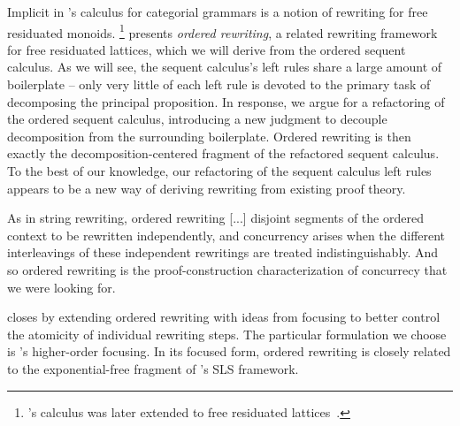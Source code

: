 Implicit in \citeauthor{Lambek:AMM58}'s calculus for categorial grammars is a notion of rewriting for free residuated monoids.%
\footnote{'s calculus was later extended to free residuated lattices~\parencites{Lambek:SLIM61}{Kanazawa:LLI92}.}
 presents \emph{ordered rewriting}, a related rewriting framework for free residuated lattices, which we will derive from the ordered sequent calculus.
As we will see, the sequent calculus's left rules share a large amount of boilerplate -- only very little of each left rule is devoted to the primary task of decomposing the principal proposition.
In response, we argue for a refactoring of the ordered sequent calculus, introducing a new judgment to decouple decomposition from the surrounding boilerplate.
Ordered rewriting is then exactly
the decomposition-centered fragment of the refactored sequent calculus.
To the best of our knowledge, our refactoring of the sequent calculus left rules appears to be a new way of deriving rewriting from existing proof theory.

As in string rewriting, ordered rewriting [...] disjoint segments of the ordered context to be rewritten independently, and concurrency arises when the different interleavings of these independent rewritings are treated indistinguishably.
And so ordered rewriting is the proof-construction characterization of concurrecy that we were looking for.

 closes by extending ordered rewriting with ideas from focusing\autocites{Andreoli:JLC92} to better control the atomicity of individual rewriting steps.
The particular formulation we choose is \citeauthor{Zeilberger:POPL08}'s higher-order focusing\autocite{Zeilberger:POPL08}.
In its focused form, ordered rewriting is closely related to the exponential-free fragment of \citeauthor{Simmons:CMU12}'s SLS framework.\autocite{Simmons:CMU12}



